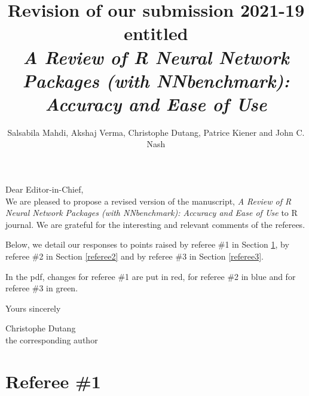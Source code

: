 \documentclass[12pt]{article}
\title{Revision of our submission 2021-19 entitled\\ \textsl{A Review of R Neural Network Packages (with NNbenchmark): Accuracy and Ease of Use}}
\author{Salsabila Mahdi, Akshaj Verma, Christophe Dutang, Patrice Kiener and John C. Nash}
\begin{document}
\maketitle

Dear Editor-in-Chief,\\

\noindent We are pleased to propose a revised version of the manuscript, 
\textsl{A Review of R Neural Network Packages (with NNbenchmark): Accuracy and Ease of Use} to R journal. 
We are grateful for the interesting and relevant comments of the referees.

\medskip
Below, we detail our responses to points raised by referee \#1 in Section \ref{referee1},
by referee \#2 in Section \ref{referee2} and by referee \#3 in Section \ref{referee3}.
\medskip

In the pdf, changes for referee  \#1 are put in red, for referee \#2 in blue and
for referee  \#3 in green.  

Yours sincerely
\bigskip


Christophe Dutang\\
the corresponding author

 
\newpage
\section{Referee \#1}\label{referee1}
\end{document}
